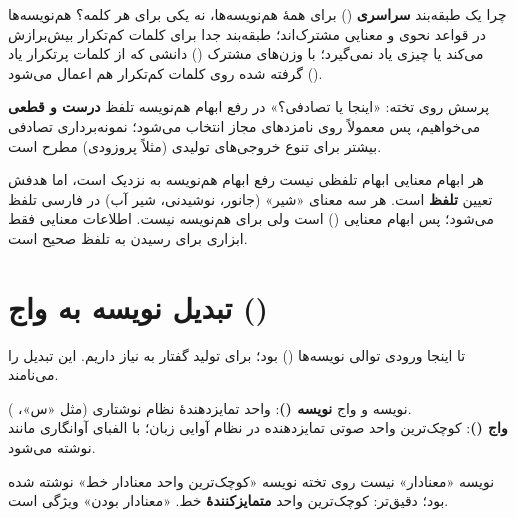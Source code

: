 
چرا یک طبقه‌بند \textbf{سراسری} () برای همهٔ هم‌نویسه‌ها، نه یکی برای هر کلمه؟ هم‌نویسه‌ها در قواعد نحوی و معنایی مشترک‌اند؛ طبقه‌بند جدا برای کلمات کم‌تکرار بیش‌برازش می‌کند یا چیزی یاد نمی‌گیرد؛ با وزن‌های مشترک () دانشی که از کلمات پرتکرار یاد گرفته شده روی کلمات کم‌تکرار هم اعمال می‌شود ().

\begin{exambox}{پرسش روی تخته: «اینجا  یا تصادفی؟»}
در رفع ابهام هم‌نویسه تلفظ \textbf{درست و قطعی} می‌خواهیم، پس معمولاً  روی نامزدهای مجاز انتخاب می‌شود؛ نمونه‌برداری تصادفی بیشتر برای تنوع خروجی‌های تولیدی (مثلاً پروزودی) مطرح است.
\end{exambox}

\begin{correctionbox}{هر ابهام معنایی ابهام تلفظی نیست}
رفع ابهام هم‌نویسه به  نزدیک است، اما هدفش تعیین \textbf{تلفظ} است. هر سه معنای «شیر» (جانور، نوشیدنی، شیر آب) در فارسی \eng{[ʃiɾ]} تلفظ می‌شود؛ پس ابهام معنایی () است ولی برای  هم‌نویسه نیست. اطلاعات معنایی فقط ابزاری برای رسیدن به تلفظ صحیح است.
\end{correctionbox}

\section{تبدیل نویسه به واج ()}

تا اینجا ورودی توالی نویسه‌ها () بود؛ برای تولید گفتار به  نیاز داریم. این تبدیل را  می‌نامند.

\begin{definitionbox}{نویسه و واج}
\textbf{نویسه ()}: واحد تمایزدهندهٔ نظام نوشتاری (مثل «س»، ). \\
\textbf{واج ()}: کوچک‌ترین واحد صوتی تمایزدهنده در نظام آوایی زبان؛ با الفبای آوانگاری مانند  نوشته می‌شود.
\end{definitionbox}

\begin{correctionbox}{نویسه «معنادار» نیست}
روی تخته نویسه «کوچک‌ترین واحد معنادار خط» نوشته شده بود؛ دقیق‌تر: کوچک‌ترین واحد \textbf{متمایزکنندهٔ} خط. «معنادار بودن» ویژگی  است.
\end{correctionbox}

